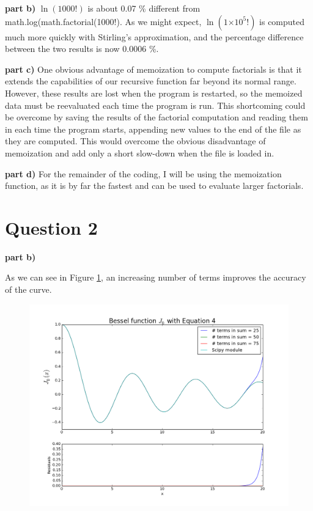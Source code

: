 \documentclass[a4paper,12pt]{article}
\providecommand{\e}[1]{\ensuremath{\times 10^{#1}}}
\begin{document}
\textbf{part b)} $\ln(1000!)$ is about 0.07 \% different from math.log(math.factorial(1000!). As we might expect, $\ln(1\e{5}!)$ is computed much more quickly with Stirling's approximation, and the percentage difference between the two results is now $0.0006$ \%.

\textbf{part c)} One obvious advantage of memoization to compute factorials is that it extends the capabilities of our recursive function far beyond its normal range. However, these results are lost when the program is restarted, so the memoized data must be reevaluated each time the program is run. This shortcoming could be overcome by saving the results of the factorial computation and reading them in each time the program starts, appending new values to the end of the file as they are computed. This would overcome the obvious disadvantage of memoization and add only a short slow-down when the file is loaded in.

\textbf{part d)} For the remainder of the coding, I will be using the memoization function, as it is by far the fastest and can be used to evaluate larger factorials.

\section{Question 2}

\textbf{part b)}

As we can see in Figure \ref{fig:q2b}, an increasing number of terms improves the accuracy of the curve.

\begin{figure}[H]
\centering
\includegraphics[width = 0.8\linewidth]{indepq2b.png}
\caption{}
\label{fig:q2b}
\end{figure}
\end{document}
